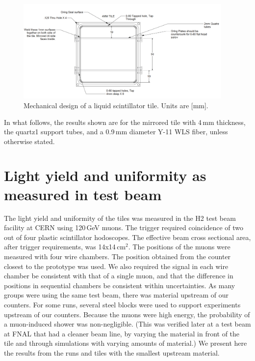 \documentclass[review]{elsarticle}
\begin{document}
\begin{figure}[!ht]
\begin{center}
\includegraphics[width=0.95\textwidth]{./figures/mechanicaldesign.png}
\caption{Mechanical design of a liquid scintillator tile. Units are
  [mm].}
\label{fig:tiledesign}
\end{center}
\end{figure}

In what follows, the results shown are for the mirrored tile with 4\,mm
thickness, the quartz1 support tubes, and a 0.9\,mm diameter Y-11 WLS fiber,
unless otherwise stated.

\section{Light yield and uniformity as measured in test beam}

The light yield and uniformity of the tiles was measured in the H2
test beam facility at CERN using 120\,GeV muons. The trigger required
coincidence of two out of four plastic scintillator hodoscopes. The
effective beam cross sectional area, after trigger requirements, was
14x14\,cm$^2$. The positions of the muons were measured with four
wire chambers. The position obtained from the counter closest to the
prototype was used. We also required the signal in each wire chamber
be consistent with that of a single muon, and that the difference in
positions in sequential chambers be consistent within uncertainties.
As many groups were using the same test beam, there was material
upstream of our counters. For some runs, several steel blocks were
used to support experiments upstream of our counters. Because the
muons were high energy, the probability of a muon-induced shower was
non-negligible. (This was verified later at a test beam at FNAL that
had a cleaner beam line, by varying the material in front of the tile
and through simulations with varying amounts of material.) We present here the
results from the runs and tiles with the smallest upstream material.
\end{document}
